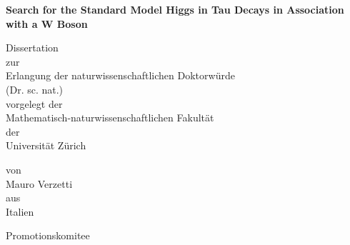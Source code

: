     \begin{titlepage}
      \setlength{\baselineskip}{8mm}
      \vspace{1cm}
     \begin{center}
       {\def\\{\linebreak}
        \huge\bf Search for the Standard Model Higgs in Tau Decays in Association with a W Boson}
      \end{center}
      \vspace{1cm}
      \begin{center}
        \Large Dissertation  \\%
        \vspace{0.4cm}
        \large zur  \\
        \vspace{0.4cm}
        \Large Erlangung der naturwissenschaftlichen Doktorw\"urde \\ %
        \Large (Dr. sc. nat.) \\
        \vspace{0.4cm}
        \large vorgelegt der \\
        \vspace{0.4cm} 
        \Large Mathematisch-naturwissenschaftlichen Fakult\"at \\
        \vspace{0.4cm}
        \large der \\
        \vspace{0.4cm}
        \Large Universit\"at Z\"urich \\
      \end{center}
      \vspace{0.2cm}
    \begin{center}
      \large von \\
      \LARGE Mauro Verzetti \\
       \vspace{0.2cm}
        \large aus \\
        \vspace{0.2cm}
        \Large Italien \\
      \end{center}
      \begin{center}
        \large Promotionskomitee \\%

\end{center}
\end{titlepage}
